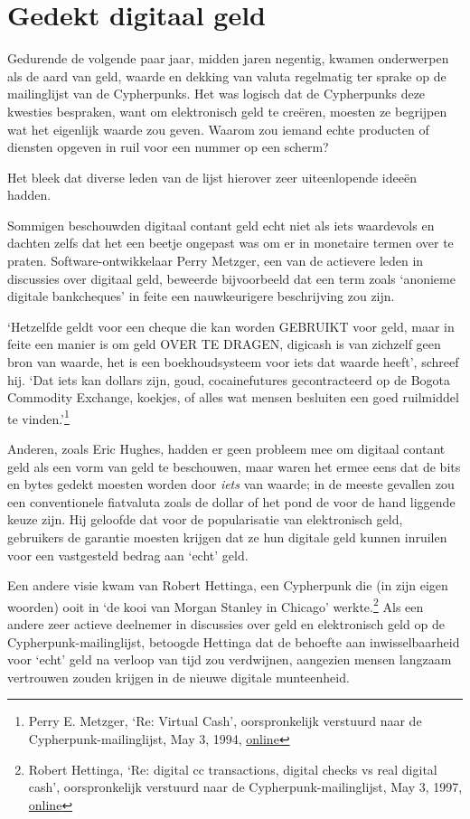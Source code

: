\documentclass[
  a5paper,
  smalldemyvopaper,11pt,twoside,onecolumn,openright,extrafontsizes,
hidelinks]{memoir}
\begin{document}
\section{Gedekt digitaal geld}\label{gedekt-digitaal-geld}

Gedurende de volgende paar jaar, midden jaren negentig, kwamen
onderwerpen als de aard van geld, waarde en dekking van valuta
regelmatig ter sprake op de mailinglijst van de Cypherpunks. Het was
logisch dat de Cypherpunks deze kwesties bespraken, want om elektronisch
geld te creëren, moesten ze begrijpen wat het eigenlijk waarde zou
geven. Waarom zou iemand echte producten of diensten opgeven in ruil
voor een nummer op een scherm?

Het bleek dat diverse leden van de lijst hierover zeer uiteenlopende
ideeën hadden.

Sommigen beschouwden digitaal contant geld echt niet als iets waardevols
en dachten zelfs dat het een beetje ongepast was om er in monetaire
termen over te praten. Software-ontwikkelaar Perry Metzger, een van de
actievere leden in discussies over digitaal geld, beweerde bijvoorbeeld
dat een term zoals `anonieme digitale bankcheques' in feite een
nauwkeurigere beschrijving zou zijn.

`Hetzelfde geldt voor een cheque die kan worden GEBRUIKT voor geld, maar
in feite een manier is om geld OVER TE DRAGEN, digicash is van zichzelf
geen bron van waarde, het is een boekhoudsysteem voor iets dat waarde
heeft', schreef hij. `Dat iets kan dollars zijn, goud, cocainefutures
gecontracteerd op de Bogota Commodity Exchange, koekjes, of alles wat
mensen besluiten een goed ruilmiddel te vinden.'\footnote{Perry E.
  Metzger, `Re: Virtual Cash', oorspronkelijk verstuurd naar de
  Cypherpunk-mailinglijst, May 3, 1994,
  \href{https://cypherpunks.venona.com/date/1994/05/msg00131.html}{online}}

Anderen, zoals Eric Hughes, hadden er geen probleem mee om digitaal
contant geld als een vorm van geld te beschouwen, maar waren het ermee
eens dat de bits en bytes gedekt moesten worden door \emph{iets} van
waarde; in de meeste gevallen zou een conventionele fiatvaluta zoals de
dollar of het pond de voor de hand liggende keuze zijn. Hij geloofde dat
voor de popularisatie van elektronisch geld, gebruikers de garantie
moesten krijgen dat ze hun digitale geld kunnen inruilen voor een
vastgesteld bedrag aan `echt' geld.

Een andere visie kwam van Robert Hettinga, een Cypherpunk die (in zijn
eigen woorden) ooit in `de kooi van Morgan Stanley in Chicago'
werkte.\footnote{Robert Hettinga, `Re: digital cc transactions, digital
  checks vs real digital cash', oorspronkelijk verstuurd naar de
  Cypherpunk-mailinglijst, May 3, 1997,
  \href{https://cypherpunks.venona.com/date/1997/05/msg00147.html}{online}}
Als een andere zeer actieve deelnemer in discussies over geld en
elektronisch geld op de Cypherpunk-mailinglijst, betoogde Hettinga dat
de behoefte aan inwisselbaarheid voor `echt' geld na verloop van tijd
zou verdwijnen, aangezien mensen langzaam vertrouwen zouden krijgen in
de nieuwe digitale munteenheid.
\end{document}
